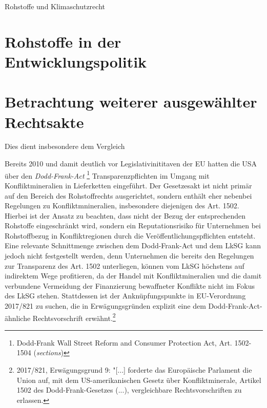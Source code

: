 \documentclass[12pt,a4paper,oneside]{book} %
\begin{document}
	Rohstoffe und Klimaschutzrecht
	
	
	\section{Rohstoffe in der Entwicklungspolitik}
	
	\section{Betrachtung weiterer ausgewählter Rechtsakte}
	
	Dies dient insbesondere dem Vergleich 
	
	Bereits 2010 und damit deutlich vor Legislativinititaven der EU hatten die USA über den \textit{Dodd-Frank-Act} \footnote{Dodd-Frank Wall Street Reform and Consumer Protection Act, Art. 1502-1504 (\textit{sections})} Transparenzpflichten im Umgang mit Konfliktmineralien in Lieferketten eingeführt. Der Gesetzesakt ist nicht primär auf den Bereich des Rohstoffrechts ausgerichtet, sondern enthält eher nebenbei Regelungen zu Konfliktmnineralien, insbesondere diejenigen des Art. 1502.  Hierbei ist der Ansatz zu beachten, dass nicht der Bezug der entsprechenden Rohstoffe eingeschränkt wird, sondern ein Reputationsrisiko für Unternehmen bei Rohstoffbezug in Konfliktregionen durch die Veröffentlichungspflichten entsteht.\autocite[Rn. 415]{ruttloff_lieferkettensorgfaltspflichtengesetz_2022} Eine relevante Schnittmenge zwischen dem Dodd-Frank-Act und dem LkSG kann jedoch nicht festgestellt werden, denn Unternehmen die bereits den Regelungen zur Transparenz des Art. 1502 unterliegen, können vom LkSG höchstens auf indirektem Wege profitieren, da der Handel mit Konfliktmineralien und die damit verbundene Vermeidung der Finanzierung bewaffneter Konflikte nicht im Fokus des LkSG stehen.\autocite[Rn 423]{ruttloff_lieferkettensorgfaltspflichtengesetz_2022} Stattdessen ist der Anknüpfungspunkte in EU-Verordnung 2017/821 zu suchen, die in Erwägungsgründen explizit eine dem Dodd-Frank-Act-ähnliche Rechtsvorschrift erwähnt.\footnote{2017/821, Erwägungsgrund 9: "[...] forderte das Europäische Parlament die Union auf, mit dem US-amerikanischen Gesetz über Konfliktminerale, Artikel 1502 des Dodd-Frank-Gesetzes (...), vergleichbare Rechtsvorschriften zu erlassen.} 
	
	
	
\end{document}
